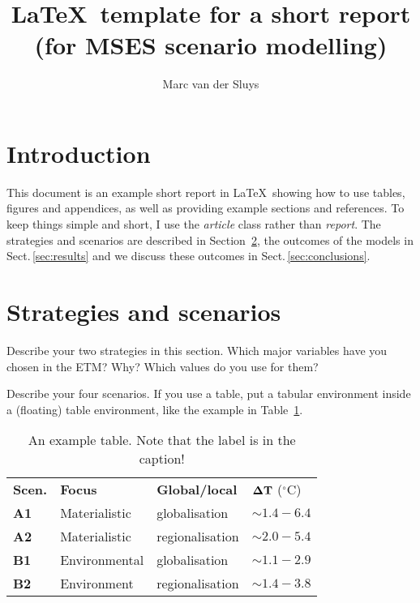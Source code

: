 \documentclass[11pt]{article}  %
\title{\LaTeX\ template for a short report (for MSES scenario modelling)}
\author{Marc van der Sluys}
\begin{document}
\maketitle

\tableofcontents


\section{Introduction}
\label{sec:intro}

This document is an example short report in \LaTeX\ showing how to use tables, figures and appendices, as well
as providing example sections and references.  To keep things simple and short, I use the \emph{article} class
rather than \emph{report}.  The strategies and scenarios are described in Section~\ref{sec:scenarios}, the
outcomes of the models in Sect.\,\ref{sec:results} and we discuss these outcomes in
Sect.\,\ref{sec:conclusions}.


\section{Strategies and scenarios}
\label{sec:scenarios}

Describe your two strategies in this section.  Which major variables have you chosen in the
ETM?  Why?  Which values do you use for them?

Describe your four scenarios.  If you use a table, put a tabular environment inside a (floating) table
environment, like the example in Table~\ref{tab:example}.

\begin{table}
  \centering
  \begin{tabular}{llll}
    \textbf{Scen.} & \textbf{Focus} & \textbf{Global/local} & $\bf \Delta T$ ($^\circ$C) \\
    \textbf{A1}    &  Materialistic & globalisation         & $\sim 1.4 - 6.4$ \\
    \textbf{A2}    &  Materialistic & regionalisation       & $\sim 2.0 - 5.4$ \\
    \textbf{B1}    &  Environmental & globalisation         & $\sim 1.1 - 2.9$ \\
    \textbf{B2}    &  Environment   & regionalisation       & $\sim 1.4 - 3.8$ \\
  \end{tabular}
  \caption{An example table.  Note that the label is in the caption!
    \label{tab:example}
  }
\end{table}
\end{document}
